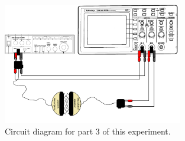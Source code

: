 \begin{figure}[h!]
        \centering
            \includegraphics[width=0.7\textwidth]{./Exp1-10/pic/part3.pdf}
        \caption{Circuit diagram for part 3 of this experiment.}
        \label{fig:part3}
\end{figure}

